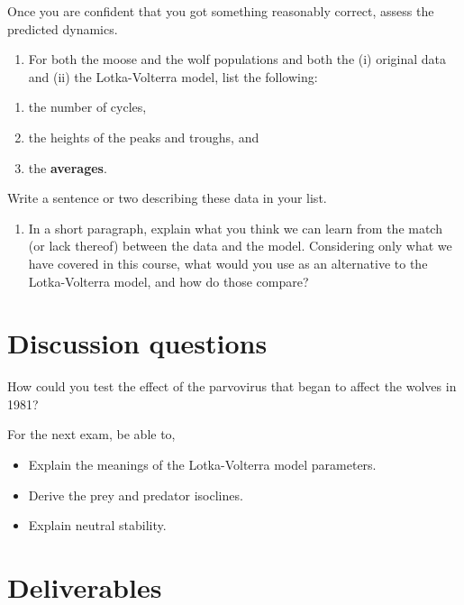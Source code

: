 \documentclass[
  letterpaper,
  DIV=11,
  numbers=noendperiod]{scrreprt}
\providecommand{\tightlist}{%
  \setlength{\itemsep}{0pt}\setlength{\parskip}{0pt}}
\begin{document}
Once you are confident that you got something reasonably correct, assess
the predicted dynamics.

\begin{enumerate}
\def\labelenumi{\arabic{enumi}.}
\setcounter{enumi}{10}
\tightlist
\item
  For both the moose and the wolf populations and both the (i) original
  data and (ii) the Lotka-Volterra model, list the following:
\end{enumerate}

\begin{enumerate}
\def\labelenumi{\roman{enumi}.}
\tightlist
\item
  the number of cycles,
\item
  the heights of the peaks and troughs, and
\item
  the \textbf{averages}.
\end{enumerate}

Write a sentence or two describing these data in your list.

\begin{enumerate}
\def\labelenumi{\arabic{enumi}.}
\setcounter{enumi}{11}
\tightlist
\item
  In a short paragraph, explain what you think we can learn from the
  match (or lack thereof) between the data and the model. Considering
  only what we have covered in this course, what would you use as an
  alternative to the Lotka-Volterra model, and how do those compare?
\end{enumerate}

\section{Discussion questions}\label{discussion-questions}

How could you test the effect of the parvovirus that began to affect the
wolves in 1981?

For the next exam, be able to,

\begin{itemize}
\tightlist
\item
  Explain the meanings of the Lotka-Volterra model parameters.
\item
  Derive the prey and predator isoclines.
\item
  Explain neutral stability.
\end{itemize}

\section{Deliverables}\label{sec-deliverables-pp}
\end{document}
